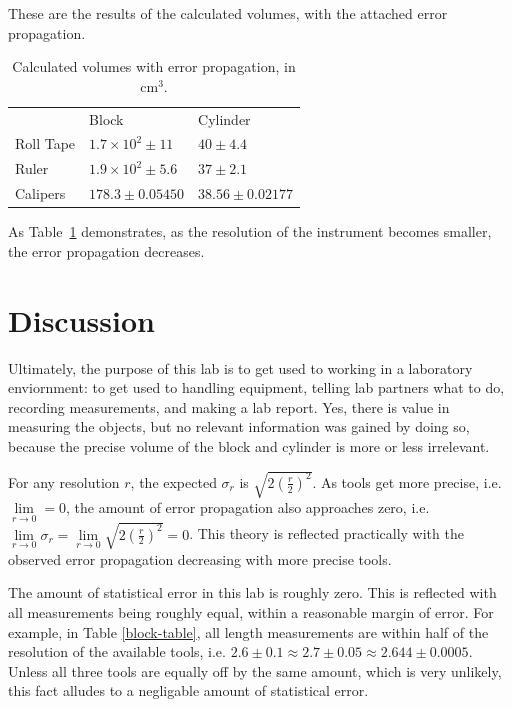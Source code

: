 \documentclass{article}
\begin{document}
These are the results of the calculated volumes, with the attached error propagation.

\begin{table}[!htbp]
	\begin{tabular}{lll}
		          & Block                   & Cylinder          \\
		Roll Tape & $1.7\times10^{2}\pm11$  & $40\pm4.4$        \\
		Ruler     & $1.9\times10^{2}\pm5.6$ & $37\pm2.1$        \\
		Calipers  & $178.3\pm0.05450$       & $38.56\pm0.02177$
	\end{tabular}
	\caption{Calculated volumes with error propagation, in cm$^3$.}
	\label{volume-table}
\end{table}

As Table~\ref{volume-table} demonstrates, as the resolution of the instrument becomes smaller, the error propagation decreases.

\section{Discussion}

Ultimately, the purpose of this lab is to get used to working in a laboratory enviornment: to get used to handling equipment, telling lab partners what to do, recording measurements, and making a lab report. Yes, there is value in measuring the objects, but no relevant information was gained by doing so, because the precise volume of the block and cylinder is more or less irrelevant.

For any resolution $r$, the expected $\sigma_{r}$ is $\sqrt{2(\frac{r}{2})^{2}}$. As tools get more precise, i.e. $\lim\limits_{r \to 0}=0$, the amount of error propagation also approaches zero, i.e. $\lim\limits_{r \to 0} \sigma_{r} = \lim\limits_{r \to 0} \sqrt{2(\frac{r}{2})^{2}}=0$. This theory is reflected practically with the observed error propagation decreasing with more precise tools.

The amount of statistical error in this lab is roughly zero. This is reflected with all measurements being roughly equal, within a reasonable margin of error. For example, in Table \ref{block-table}, all length measurements are within half of the resolution of the available tools, i.e. $2.6\pm0.1 \approx 2.7\pm0.05 \approx 2.644\pm0.0005$. Unless all three tools are equally off by the same amount, which is very unlikely, this fact alludes to a negligable amount of statistical error.
\end{document}

